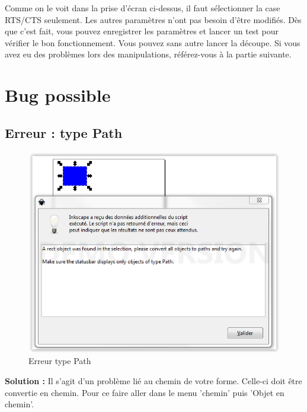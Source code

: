 \documentclass[a4paper,oneside,12pt]{report}
\begin{document}
Comme on le voit dans la prise d'écran ci-dessus, il faut sélectionner la case RTS/CTS seulement. 
Les autres paramètres n'ont pas besoin d'être modifiés. Dès que c'est fait, vous pouvez enregistrer les paramètres et lancer un test pour vérifier le bon fonctionnement.
Vous pouvez sans autre lancer la découpe. Si vous avez eu des problèmes lors des manipulations, référez-vous à la partie suivante.

\newpage
\section{Bug possible}

\subsection{Erreur : type Path}

\begin{figure}[h]
 \begin{center}
  \includegraphics[width=15cm]{imgs/inkcutErrorPath.png}
  \caption{ Erreur type Path  }
 \end{center}
\end{figure}

\textbf{Solution :} Il s'agit d'un problème lié au chemin de votre forme. Celle-ci doit être convertie en chemin. 
Pour ce faire aller dans le menu 'chemin' puis 'Objet en chemin'.
\newpage
\end{document}
